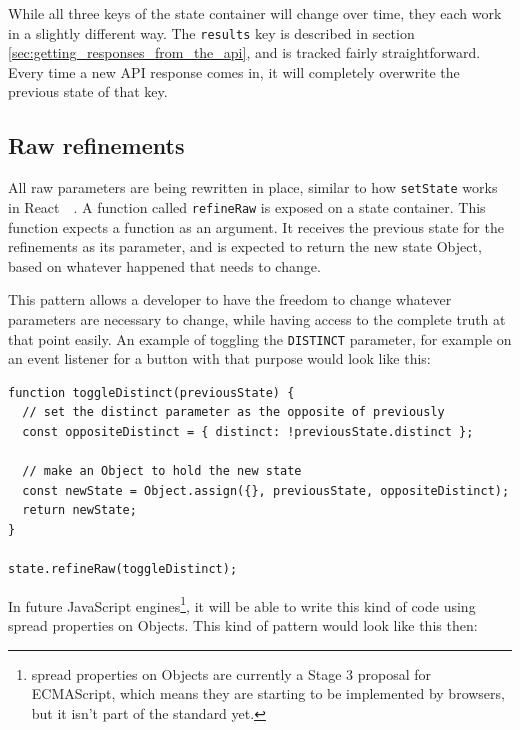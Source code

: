 While all three keys of the state container will change over time, they each work in a slightly different way. The {\tt results} key is described in section \ref{sec:getting_responses_from_the_api}, and is tracked fairly straightforward. Every time a new API response comes in, it will completely overwrite the previous state of that key. 

\subsection{Raw refinements}
\label{ssec:raw-refinments}

All raw parameters are being rewritten in place, similar to how {\tt setState} works in React~\cite{react-doc-state}~. A function called {\tt refineRaw} is exposed on a state container. This function expects a function as an argument. It receives the previous state for the refinements as its parameter, and is expected to return the new state Object, based on whatever happened that needs to change.

This pattern allows a developer to have the freedom to change whatever parameters are necessary to change, while having access to the complete truth at that point easily. An example of toggling the {\tt DISTINCT} parameter, for example on an event listener for a button with that purpose would look like this:

\begin{minipage}{\linewidth}
\begin{lstlisting}[caption={Toggling the {\tt DISTINCT} parameter},label={lst:is-core-raw}]
function toggleDistinct(previousState) {
  // set the distinct parameter as the opposite of previously
  const oppositeDistinct = { distinct: !previousState.distinct };

  // make an Object to hold the new state
  const newState = Object.assign({}, previousState, oppositeDistinct);
  return newState;
}

state.refineRaw(toggleDistinct);
\end{lstlisting}
\end{minipage}

In future JavaScript engines\footnote{spread properties on Objects are currently a Stage 3 proposal for ECMAScript\cite{es-prop-spread}, which means they are starting to be implemented by browsers, but it isn't part of the standard yet.}, it will be able to write this kind of code using spread properties on Objects. This kind of pattern would look like this then:

